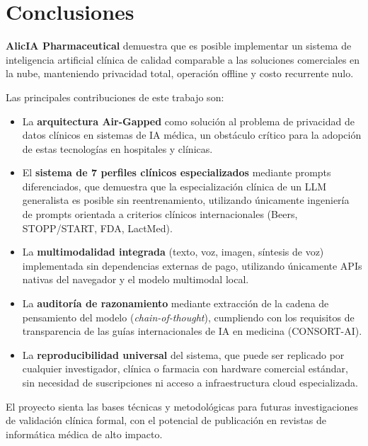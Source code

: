 \documentclass[12pt,a4paper]{article}
\begin{document}
\newpage

\section{Conclusiones}

\textbf{AlicIA Pharmaceutical} demuestra que es posible implementar un sistema de inteligencia
artificial clínica de calidad comparable a las soluciones comerciales en la nube, manteniendo
privacidad total, operación offline y costo recurrente nulo.

Las principales contribuciones de este trabajo son:

\begin{itemize}
  \item La \textbf{arquitectura Air-Gapped} como solución al problema de privacidad de datos
    clínicos en sistemas de IA médica, un obstáculo crítico para la adopción de estas tecnologías
    en hospitales y clínicas.

  \item El \textbf{sistema de 7 perfiles clínicos especializados} mediante prompts diferenciados,
    que demuestra que la especialización clínica de un LLM generalista es posible sin reentrenamiento,
    utilizando únicamente ingeniería de prompts orientada a criterios clínicos internacionales
    (Beers, STOPP/START, FDA, LactMed).

  \item La \textbf{multimodalidad integrada} (texto, voz, imagen, síntesis de voz) implementada
    sin dependencias externas de pago, utilizando únicamente APIs nativas del navegador y el
    modelo multimodal local.

  \item La \textbf{auditoría de razonamiento} mediante extracción de la cadena de pensamiento del
    modelo (\textit{chain-of-thought}), cumpliendo con los requisitos de transparencia de las
    guías internacionales de IA en medicina (CONSORT-AI).

  \item La \textbf{reproducibilidad universal} del sistema, que puede ser replicado por cualquier
    investigador, clínica o farmacia con hardware comercial estándar, sin necesidad de suscripciones
    ni acceso a infraestructura cloud especializada.
\end{itemize}

El proyecto sienta las bases técnicas y metodológicas para futuras investigaciones de validación
clínica formal, con el potencial de publicación en revistas de informática médica de alto impacto.
\end{document}
